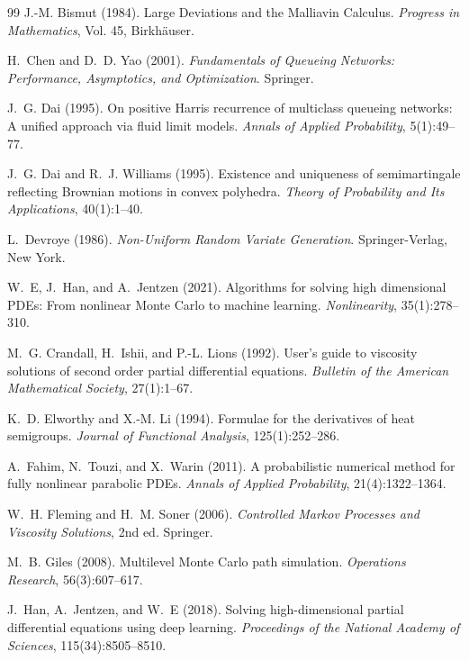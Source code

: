 \documentclass[11pt]{article}
\theoremstyle{definition}
\theoremstyle{plain}
\begin{document}
\begin{appendices}
\begin{thebibliography}{99}
 J.-M. Bismut (1984). \newblock Large Deviations and the Malliavin Calculus. \newblock \emph{Progress in Mathematics}, Vol. 45, Birkh\"auser.

 H.~Chen and D.~D. Yao (2001). \newblock \emph{Fundamentals of Queueing Networks: Performance, Asymptotics, and Optimization}. \newblock Springer.

 J.~G. Dai (1995). \newblock On positive Harris recurrence of multiclass queueing networks: A unified approach via fluid limit models. \newblock \emph{Annals of Applied Probability}, 5(1):49--77.

 J.~G. Dai and R.~J. Williams (1995). \newblock Existence and uniqueness of semimartingale reflecting Brownian motions in convex polyhedra. \newblock \emph{Theory of Probability and Its Applications}, 40(1):1--40.

 L.~Devroye (1986). \newblock \emph{Non-Uniform Random Variate Generation}. \newblock Springer-Verlag, New York.

 W.~E, J.~Han, and A.~Jentzen (2021). \newblock Algorithms for solving high dimensional PDEs: From nonlinear Monte Carlo to machine learning. \newblock \emph{Nonlinearity}, 35(1):278--310.

 M.~G. Crandall, H.~Ishii, and P.-L. Lions (1992). \newblock User's guide to viscosity solutions of second order partial differential equations. \newblock \emph{Bulletin of the American Mathematical Society}, 27(1):1--67.

 K.~D. Elworthy and X.-M. Li (1994). \newblock Formulae for the derivatives of heat semigroups. \newblock \emph{Journal of Functional Analysis}, 125(1):252--286.

 A.~Fahim, N.~Touzi, and X.~Warin (2011). \newblock A probabilistic numerical method for fully nonlinear parabolic PDEs. \newblock \emph{Annals of Applied Probability}, 21(4):1322--1364.

 W.~H. Fleming and H.~M. Soner (2006). \newblock \emph{Controlled Markov Processes and Viscosity Solutions}, 2nd ed. \newblock Springer.

 M.~B. Giles (2008). \newblock Multilevel Monte Carlo path simulation. \newblock \emph{Operations Research}, 56(3):607--617.

 J.~Han, A.~Jentzen, and W.~E (2018). \newblock Solving high-dimensional partial differential equations using deep learning. \newblock \emph{Proceedings of the National Academy of Sciences}, 115(34):8505--8510.


\end{thebibliography}
\end{appendices}
\end{document}

